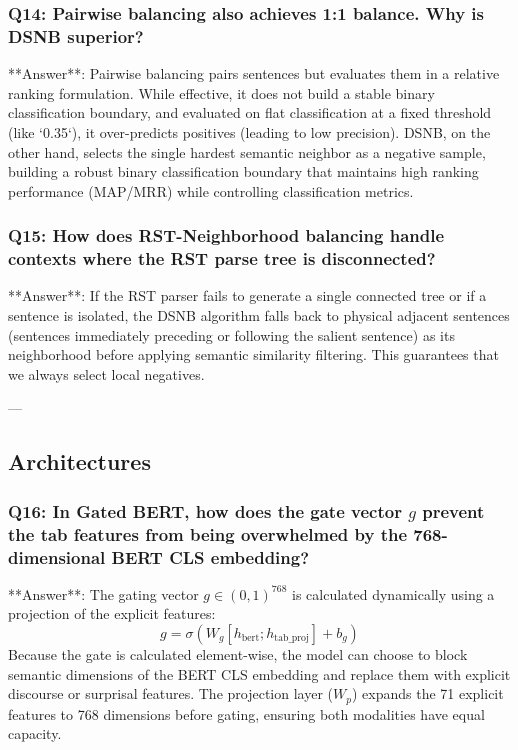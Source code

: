 \documentclass[11pt,a4paper]{article}
\begin{document}
\subsubsection{Q14: Pairwise balancing also achieves 1:1 balance. Why is DSNB superior?}
**Answer**: Pairwise balancing pairs sentences but evaluates them in a relative ranking formulation. While effective, it does not build a stable binary classification boundary, and evaluated on flat classification at a fixed threshold (like `0.35`), it over-predicts positives (leading to low precision). 
DSNB, on the other hand, selects the single hardest semantic neighbor as a negative sample, building a robust binary classification boundary that maintains high ranking performance (MAP/MRR) while controlling classification metrics.

\subsubsection{Q15: How does RST-Neighborhood balancing handle contexts where the RST parse tree is disconnected?}
**Answer**: If the RST parser fails to generate a single connected tree or if a sentence is isolated, the DSNB algorithm falls back to physical adjacent sentences (sentences immediately preceding or following the salient sentence) as its neighborhood before applying semantic similarity filtering. This guarantees that we always select local negatives.

---

\subsection{Architectures}

\subsubsection{Q16: In Gated BERT, how does the gate vector $g$ prevent the tab features from being overwhelmed by the 768-dimensional BERT CLS embedding?}
**Answer**: The gating vector $g \in (0, 1)^{768}$ is calculated dynamically using a projection of the explicit features:
\[
g = \sigma(W_g [h_{\text{bert}}; h_{\text{tab\_proj}}] + b_g)
\]
Because the gate is calculated element-wise, the model can choose to block semantic dimensions of the BERT CLS embedding and replace them with explicit discourse or surprisal features. The projection layer ($W_p$) expands the 71 explicit features to 768 dimensions before gating, ensuring both modalities have equal capacity.
\end{document}
